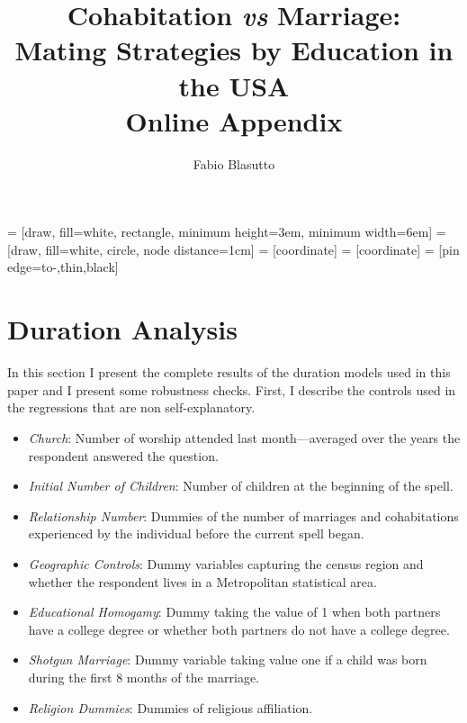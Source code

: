 \documentclass[12pt]{article}
\title{Cohabitation \textit{vs} Marriage:\\ Mating Strategies by Education in the USA \\ \textbf{Online Appendix}}
\author{Fabio Blasutto}
\begin{document}

 	 = [draw, fill=white, rectangle, 
 	minimum height=3em, minimum width=6em]
 	 = [draw, fill=white, circle, node distance=1cm]
 	 = [coordinate]
 	 = [coordinate]
 	 = [pin edge={to-,thin,black}]
 	
 	



	\maketitle
\appendix
\section{Duration Analysis}\label{subsection:duration}
In this section I present the complete results of the duration models used in this paper and I present some robustness checks. First, I describe the controls used in the regressions that are non self-explanatory.
\begin{itemize}
  \setlength{\itemsep}{1pt}
\setlength{\parskip}{0pt}
\setlength{\parsep}{0pt}
\item \textit{Church}: Number of worship attended last month---averaged over the years the respondent answered the question.
\item \textit{Initial Number of Children}: Number of children at the beginning of the spell. 
\item \textit{Relationship Number}: Dummies of the number of marriages and cohabitations experienced by the individual before the current spell began.
\item \textit{Geographic Controls}: Dummy variables capturing the census region and whether the respondent lives in a Metropolitan statistical area.
\item \textit{Educational Homogamy}: Dummy taking the value of 1 when both partners have a college degree or whether both partners do not have a college degree.
\item \textit{Shotgun Marriage}: Dummy variable taking value one if a child was born during the first 8 months of the marriage.
\item \textit{Religion Dummies}: Dummies of religious affiliation.
\end{itemize} 
\end{document}
